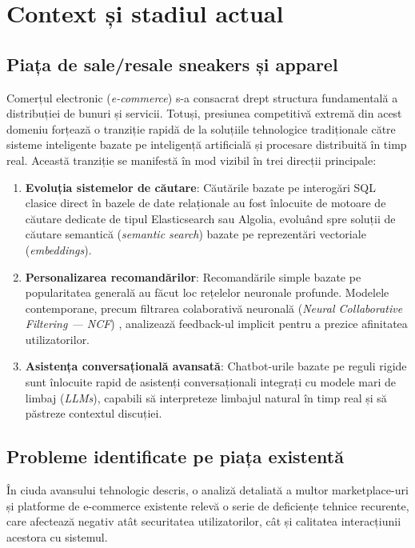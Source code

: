 \chapter{Context și stadiul actual}

\section{Piața de sale/resale sneakers și apparel}

Comerțul electronic (\textit{e-commerce}) s-a consacrat drept structura fundamentală a distribuției de bunuri și servicii. Totuși, presiunea competitivă extremă din acest domeniu forțează o tranziție rapidă de la soluțiile tehnologice tradiționale către sisteme inteligente bazate pe inteligență artificială și procesare distribuită în timp real. Această tranziție se manifestă în mod vizibil în trei direcții principale:
\begin{enumerate}
    \item \textbf{Evoluția sistemelor de căutare}: Căutările bazate pe interogări SQL clasice direct în bazele de date relaționale au fost înlocuite de motoare de căutare dedicate de tipul Elasticsearch sau Algolia, evoluând spre soluții de căutare semantică (\textit{semantic search}) bazate pe reprezentări vectoriale (\textit{embeddings}).
    \item \textbf{Personalizarea recomandărilor}: Recomandările simple bazate pe popularitatea generală au făcut loc rețelelor neuronale profunde. Modelele contemporane, precum filtrarea colaborativă neuronală (\textit{Neural Collaborative Filtering --- NCF}) \cite{he2017ncf}, analizează feedback-ul implicit pentru a prezice afinitatea utilizatorilor.
    \item \textbf{Asistența conversațională avansată}: Chatbot-urile bazate pe reguli rigide sunt înlocuite rapid de asistenți conversaționali integrați cu modele mari de limbaj (\textit{LLMs}), capabili să interpreteze limbajul natural în timp real și să păstreze contextul discuției.
\end{enumerate}

\section{Probleme identificate pe piața existentă}

În ciuda avansului tehnologic descris, o analiză detaliată a multor marketplace-uri și platforme de e-commerce existente relevă o serie de deficiențe tehnice recurente, care afectează negativ atât securitatea utilizatorilor, cât și calitatea interacțiunii acestora cu sistemul.


